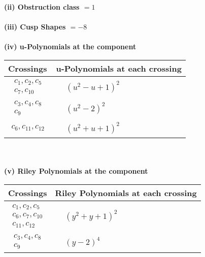 \documentclass[1p]{elsarticle_modified}
\theoremstyle{definition}
\begin{document}
\flushleft \textbf{(ii) Obstruction class $= 1$}\\~\\
\flushleft \textbf{(iii) Cusp Shapes $= -8$}\\~\\
\newpage\renewcommand{\arraystretch}{1}
\flushleft \textbf{(iv) u-Polynomials at the component}\newline \\
\begin{tabular}{m{50pt}|m{274pt}}
Crossings & \hspace{64pt}u-Polynomials at each crossing \\
\hline $$\begin{aligned}c_{1},c_{2},c_{5}\\c_{7},c_{10}\end{aligned}$$&$\begin{aligned}
&(u^2- u+1)^2
\end{aligned}$\\
\hline $$\begin{aligned}c_{3},c_{4},c_{8}\\c_{9}\end{aligned}$$&$\begin{aligned}
&(u^2-2)^2
\end{aligned}$\\
\hline $$\begin{aligned}c_{6},c_{11},c_{12}\end{aligned}$$&$\begin{aligned}
&(u^2+u+1)^2
\end{aligned}$\\
\hline
\end{tabular}\\~\\
\newpage\renewcommand{\arraystretch}{1}
\flushleft \textbf{(v) Riley Polynomials at the component}\newline \\
\begin{tabular}{m{50pt}|m{274pt}}
Crossings & \hspace{64pt}Riley Polynomials at each crossing \\
\hline $$\begin{aligned}c_{1},c_{2},c_{5}\\c_{6},c_{7},c_{10}\\c_{11},c_{12}\end{aligned}$$&$\begin{aligned}
&(y^2+y+1)^2
\end{aligned}$\\
\hline $$\begin{aligned}c_{3},c_{4},c_{8}\\c_{9}\end{aligned}$$&$\begin{aligned}
&(y-2)^4
\end{aligned}$\\
\hline
\end{tabular}\\~\\
\end{document}

